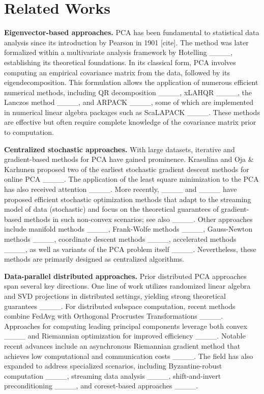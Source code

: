 \section{Related Works}
\vspace{-0.2cm}
\noindent \textbf{Eigenvector-based approaches.} PCA has been fundamental to statistical data analysis since its introduction by Pearson in 1901 [cite]. The method was later formalized within a multivariate analysis framework by Hotelling ____, establishing its theoretical foundations. In its classical form, PCA involves computing an empirical covariance matrix from the data, followed by its eigendecomposition. This formulation allows the application of numerous efficient numerical methods, including QR decomposition ____, xLAHQR ____, the Lanczos method ____, and ARPACK ____, some of which are implemented in numerical linear algebra packages such as ScaLAPACK ____. 
These methods are effective but often require complete knowledge of the covariance matrix prior to computation.

\noindent\textbf{Centralized stochastic approaches.} With large datasets, iterative and gradient-based methods for PCA have gained prominence.
Krasulina and Oja \& Karhunen proposed two of the earliest stochastic gradient descent methods for online PCA ____. 
The application of the
least square minimization to the PCA has also received attention ____.
More recently, ____ and ____ have proposed efficient stochastic optimization methods that adapt to the streaming model of data (stochastic) and focus on the theoretical guarantees of gradient-based methods in such non-convex scenarios; see also ____.
Other approaches include manifold methods ____, Frank-Wolfe methods ____, Gauss-Newton methods ____, coordinate descent methods ____, accelerated methods ____, as well as variants of the PCA problem itself ____.
Nevertheless, these methods are primarily designed as centralized algorithms.

\noindent \textbf{Data-parallel distributed approaches.}
Prior distributed PCA approaches span several key directions. One line of work utilizes randomized linear algebra and SVD projections in distributed settings, yielding strong theoretical guarantees ____. For distributed subspace computation, recent methods combine FedAvg with Orthogonal Procrustes Transformations ____. Approaches for computing leading principal components leverage both convex ____ and Riemannian optimization for improved efficiency ____. Notable recent advances include an asynchronous Riemannian gradient method that achieves low computational and communication costs ____. The field has also expanded to address specialized scenarios, including Byzantine-robust computation ____, streaming data analysis ____, shift-and-invert preconditioning ____, and coreset-based approaches ____.

